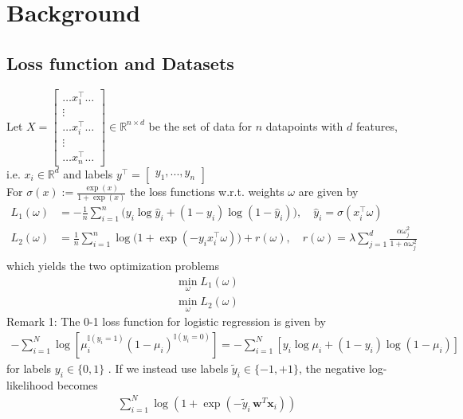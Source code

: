 \documentclass{article}
\begin{document}
\section{Background}
\subsection{Loss function and Datasets}
Let 
$X = 
\begin{bmatrix}
\hdots x_1^\top \hdots \\
\vdots \\
\hdots x_i^\top \hdots\\
\vdots \\
\hdots x_n^\top \hdots
\end{bmatrix}
\in \mathbb{R}^{n \times d}$ \quad be the set of data for $n$ datapoints with $d$ features, i.e. $x_i \in \mathbb{R}^d$ and labels $y^\top = \begin{bmatrix} y_1,...,y_n\end{bmatrix}$\\
For $\sigma(x) := \frac{\exp(x)}{1+\exp(x)}$ the loss functions w.r.t. weights $\omega$ are given by
\begin{align}
L_1(\omega) &= -\frac{1}{n} \sum_{i=1}^{n} \Big( y_i \log \hat{y}_i + (1 - y_i) \log (1 - \hat{y}_i) \Big), \quad \hat{y}_i = \sigma(x_i^\top \omega) \\
L_2(\omega) &= \frac{1}{n} \sum_{i=1}^{n} \log\big(1 + \exp(-y_i x_i^\top \omega)\big) + r(\omega), \quad
r(\omega) = \lambda \sum_{j=1}^{d} \frac{\alpha \omega _j^2}{1 + \alpha \omega _j^2} \\
\end{align}
which yields the two optimization problems
\begin{align}
  \min _{\omega} L_1(\omega)\\
  \min _{\omega} L_2(\omega)
\end{align}
Remark 1: The 0-1 loss function for logistic regression is given by
\begin{align*}
  -\sum_{i=1}^N \log\left[ \mu_i^{\mathbb{I}(y_i=1)} (1-\mu_i)^{\mathbb{I}(y_i=0)} \right] 
  =  -\sum_{i=1}^N \left[ y_i \log \mu_i + (1 - y_i) \log(1-\mu_i) \right]
\end{align*}
for labels $y_i \in \{0,1\}$ \cite[Eq.~8.2--8.3]{murphy2012ml}.
If we instead use labels $\tilde{y}_i \in \{-1, +1\}$, the negative log-likelihood becomes
\begin{align*}
  \sum_{i=1}^N \log\left(1 + \exp(-\tilde{y}_i\,\mathbf{w}^T\mathbf{x}_i)\right)
\end{align*}
\end{document}
